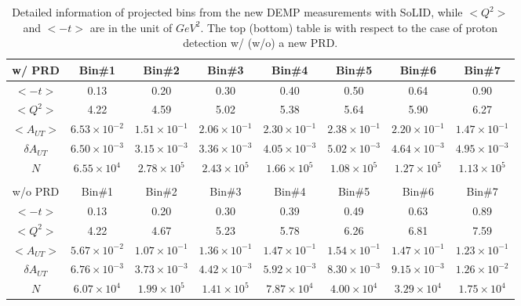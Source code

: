 \begin{table}[!ht]
\centering
\begin{tabular}{|c|c|c|c|c|c|c|c|}
   	\hline 
w/ PRD   &  Bin\#1 & Bin\#2 & Bin\#3 & Bin\#4 & Bin\#5 & Bin\#6 & Bin\#7 \\
 \hline
  $<-t>$          &  0.13  & 0.20   & 0.30   & 0.40   & 0.50   & 0.64   & 0.90  \\
  $<Q^{2}>$        & 4.22  & 4.59   & 5.02   & 5.38   & 5.64   & 5.90  & 6.27  \\
  $<A_{UT}>$       &$6.53\times 10^{-2}$ & $1.51\times 10^{-1}$ & $2.06\times 10^{-1}$ & $2.30\times 10^{-1}$ & $2.38\times 10^{-1}$  & $2.20\times 10^{-1}$ & $1.47\times 10^{-1}$ \\
  $\delta A_{UT}$  &$6.50\times 10^{-3}$ & $3.15\times 10^{-3}$ & $3.36\times 10^{-3}$ & $4.05\times 10^{-3}$ & $5.02\times 10^{-3}$  & $4.64\times 10^{-3}$ & $4.95\times 10^{-3}$ \\
  $N$             &$6.55\times 10^{4}$  & $2.78\times 10^{5}$  & $2.43\times 10^{5}$  & $1.66\times 10^{5}$  & $1.08\times 10^{5}$  &  $1.27\times 10^{5}$ &$1.13\times 10^{5}$  \\
 \hline
 	\multicolumn{3}{c}{ } \\
  \hline
w/o PRD   &  Bin\#1 & Bin\#2 & Bin\#3 & Bin\#4 & Bin\#5 & Bin\#6 & Bin\#7 \\
\hline 
   $<-t>$          &  0.13 & 0.20   & 0.30   & 0.39   & 0.49   & 0.63   & 0.89  \\
   $<Q^{2}>$       & 4.22  & 4.67   & 5.23   & 5.78   & 6.26   & 6.81  & 7.59  \\
   $<A_{UT}>$      &$5.67\times 10^{-2}$   & $1.07\times 10^{-1}$ & $1.36\times 10^{-1}$ & $1.47\times 10^{-1}$ & $1.54\times 10^{-1}$ & $1.47\times 10^{-1}$   & $1.23\times 10^{-1}$   \\
   $\delta A_{UT}$ &  $6.76\times 10^{-3}$ & $3.73\times 10^{-3}$ & $4.42\times 10^{-3}$ & $5.92\times 10^{-3}$ & $8.30\times 10^{-3}$ &   $9.15\times 10^{-3}$ &   $1.26\times 10^{-2}$ \\
   $N$            & $6.07\times 10^{4}$   & $1.99\times 10^{5}$  & $1.41\times 10^{5}$  & $7.87\times 10^{4}$  & $4.00\times 10^{4}$  &  $3.29\times 10^{4}$  &$1.75\times 10^{4}$  \\
 \hline
\end{tabular}
\caption[Detailed information of projected bins]{\footnotesize{Detailed
    information of projected bins from the new DEMP measurements with SoLID,
    while $<Q^{2}>$ and $<-t>$ are in the unit of $GeV^{2}$. The top (bottom)
    table is with respect to the case of proton detection w/ (w/o) a new PRD.}}
\label{asym_bin_table}
\end{table} 

